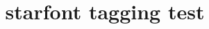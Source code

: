 \documentclass{article}
\title{starfont tagging test}
\begin{document}
\Jupiter

\varTerra

\Cancer

\SouthNode

\Natal
\end{document}

